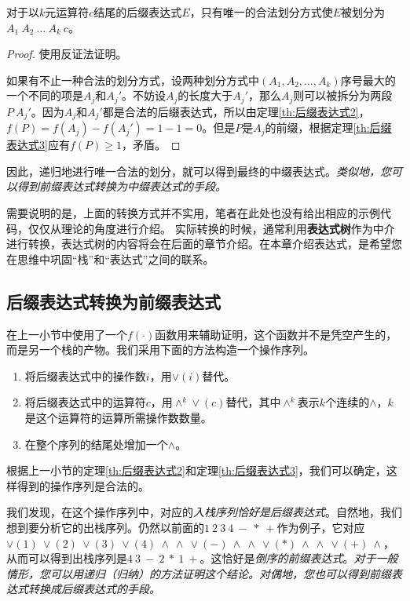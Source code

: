 \begin{theorem}
    对于以$k$元运算符$c$结尾的后缀表达式$E$，只有唯一的合法划分方式使$E$被划分为$A_1\ A_2\ \dots\ A_k\ c$。
\end{theorem}

\begin{proof}
使用反证法证明。

    如果有不止一种合法的划分方式，设两种划分方式中$(A_1,A_2,\dots,A_k)$序号最大的一个不同的项是$A_j$和$A_j'$。不妨设$A_j$的长度大于$A_j'$，那么$A_j$则可以被拆分为两段$P\ A_j'$。因为$A_j$和$A_j'$都是合法的后缀表达式，所以由定理\ref{th:后缀表达式2}，$f(P) = f(A_j) - f(A_j') = 1-1=0$。但是$P$是$A_j$的前缀，根据定理\ref{th:后缀表达式3}应有$f(P)\ge 1$，矛盾。
\end{proof}

因此，递归地进行唯一合法的划分，就可以得到最终的中缀表达式。\textit{类似地，您可以得到前缀表达式转换为中缀表达式的手段。}

需要说明的是，上面的转换方式并不实用，笔者在此处也没有给出相应的示例代码，仅仅从理论的角度进行介绍。
实际转换的时候，通常利用\textbf{表达式树}作为中介进行转换，表达式树的内容将会在后面的章节介绍。在本章介绍表达式，是希望您在思维中巩固“栈”和“表达式”之间的联系。

\subsection{后缀表达式转换为前缀表达式}
在上一小节中使用了一个$f(\cdot)$函数用来辅助证明，这个函数并不是凭空产生的，而是另一个栈的产物。我们采用下面的方法构造一个操作序列。

\begin{enumerate}
    \item 将后缀表达式中的操作数$i$，用$\lor(i)$替代。
    \item 将后缀表达式中的运算符$c$，用$\land ^k \lor(c)$替代，其中$\land^k$表示$k$个连续的$\land$，$k$是这个运算符的运算所需操作数数量。
    \item 在整个序列的结尾处增加一个$\land$。
\end{enumerate}


根据上一小节的定理\ref{th:后缀表达式2}和定理\ref{th:后缀表达式3}，我们可以确定，这样得到的操作序列是合法的。

我们发现，在这个操作序列中，对应的\textit{入栈序列恰好是后缀表达式}。自然地，我们想到要分析它的出栈序列。仍然以前面的$1\ 2\ 3\ 4\ -\ *\ +$作为例子，它对应$\lor(1)\ \lor(2)\ \lor(3)\ \lor(4)\ \land\ \land\ \lor(-)\ \land\ \land\ \lor(*)\ \land\ \land\ \lor(+)\ \land$，从而可以得到出栈序列是$4\ 3\ -\ 2\ *\ 1\ +$。这恰好是\textit{倒序的前缀表达式}。\textit{对于一般情形，您可以用递归（归纳）的方法证明这个结论。对偶地，您也可以得到前缀表达式转换成后缀表达式的手段。}


